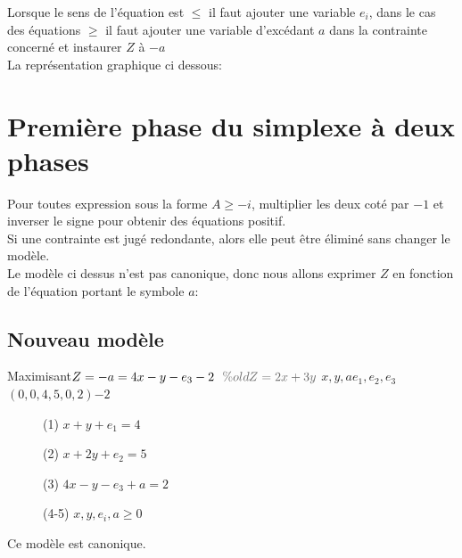 Lorsque le sens de l'équation est $\leqslant$ il faut ajouter une variable $e_i$, dans le cas des équations $\geqslant$
il faut ajouter une variable d'excédant $a$ dans la contrainte concerné et instaurer $Z$ à $- a$\\
La représentation graphique ci dessous:\\
\begin{center}
\end{center}
\section{Première phase du simplexe à deux phases}
Pour toutes expression sous la forme $ A \geqslant -i$, multiplier les deux coté par $-1$ et inverser le signe pour obtenir des équations positif.\\
Si une contrainte est jugé redondante, alors elle peut être éliminé sans changer le modèle.\\
Le modèle ci dessus n'est pas canonique, donc nous allons exprimer $Z$ en fonction de l'équation portant le symbole $a$:\\
\subsection{Nouveau modèle}
        {Maximisant}{$Z = -a = 4x -y -e_3 -2\ \ \cgris{\% oldZ = 2x + 3y}$}
        {$x,y,a$}{$e_1,e_2,e_3$}{$(0,0,4,5,0,2)$}{$-2$}
        {\begin{description}
\item[] (1) $x + y + e_1 = 4$
\item[] (2) $x + 2y + e_2 = 5$
\item[] (3) $4x -y - e_3 + a = 2$
\item[] (4-5) $x,y,e_i,a \geqslant 0$
\end{description}
}
Ce modèle est canonique.

